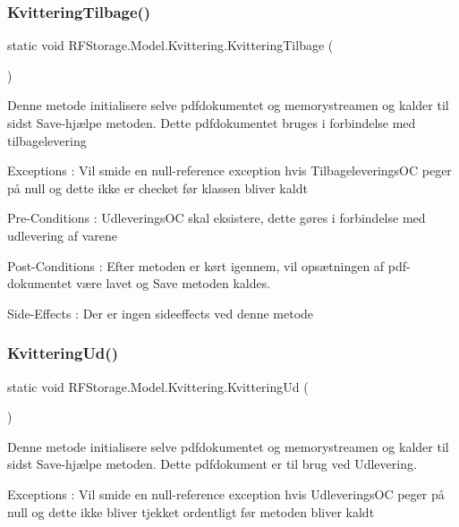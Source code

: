 \subsubsection{\texorpdfstring{KvitteringTilbage()}{KvitteringTilbage()}}
{\footnotesize\ttfamily static void R\+F\+Storage.\+Model.\+Kvittering.\+Kvittering\+Tilbage (\begin{DoxyParamCaption}{ }\end{DoxyParamCaption})\hspace{0.3cm}{\ttfamily [static]}}



Denne metode initialisere selve pdfdokumentet og memorystreamen og kalder til sidst Save-\/hjælpe metoden. Dette pdfdokumentet bruges i forbindelse med tilbagelevering 

Exceptions \+: Vil smide en null-\/reference exception hvis Tilbageleverings\+OC peger på null og dette ikke er checket før klassen bliver kaldt 

Pre-\/\+Conditions \+: Udleverings\+OC skal eksistere, dette gøres i forbindelse med udlevering af varene 

Post-\/\+Conditions \+: Efter metoden er kørt igennem, vil opsætningen af pdf-\/dokumentet være lavet og Save metoden kaldes. 

Side-\/\+Effects \+: Der er ingen sideeffects ved denne metode \mbox{\label{class_r_f_storage_1_1_model_1_1_kvittering_acca12604adfc5e6138058525889eae03}} 
\subsubsection{\texorpdfstring{KvitteringUd()}{KvitteringUd()}}
{\footnotesize\ttfamily static void R\+F\+Storage.\+Model.\+Kvittering.\+Kvittering\+Ud (\begin{DoxyParamCaption}{ }\end{DoxyParamCaption})\hspace{0.3cm}{\ttfamily [static]}}



Denne metode initialisere selve pdfdokumentet og memorystreamen og kalder til sidst Save-\/hjælpe metoden. Dette pdfdokument er til brug ved Udlevering. 

Exceptions \+: Vil smide en null-\/reference exception hvis Udleverings\+OC peger på null og dette ikke bliver tjekket ordentligt før metoden bliver kaldt

